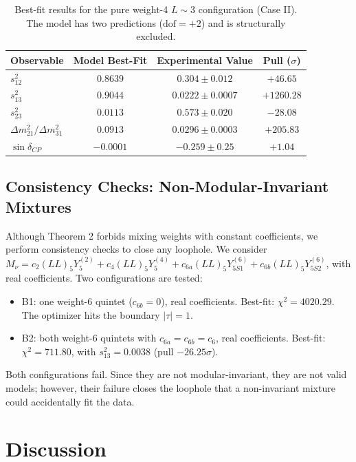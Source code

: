 \documentclass[11pt, a4paper]{article}
\begin{document}
\begin{table}[h]
\centering
\begin{tabular}{lccc}
\toprule
Observable & Model Best-Fit & Experimental Value & Pull (\(\sigma\)) \\
\midrule
\(s_{12}^2\) & \(0.8639\) & \(0.304 \pm 0.012\) & \(+46.65\) \\
\(s_{13}^2\) & \(0.9044\) & \(0.0222 \pm 0.0007\) & \(\mathbf{+1260.28}\) \\
\(s_{23}^2\) & \(0.0113\) & \(0.573 \pm 0.020\) & \(-28.08\) \\
\(\Delta m^2_{21}/\Delta m^2_{31}\) & \(0.0913\) & \(0.0296 \pm 0.0003\) & \(+205.83\) \\
\(\sin\delta_{CP}\) & \(-0.0001\) & \(-0.259 \pm 0.25\) & \(+1.04\) \\
\bottomrule
\end{tabular}
\caption{Best-fit results for the pure weight-4 \(L\sim 3\) configuration (Case II). The model has two predictions (\(\mathrm{dof}=+2\)) and is structurally excluded.}
\label{tab:L3_w4_fit}
\end{table}

\subsection{Consistency Checks: Non-Modular-Invariant Mixtures}
Although Theorem 2 forbids mixing weights with constant coefficients, we perform consistency checks to close any loophole. We consider \(M_\nu = c_2 (LL)_5 Y_5^{(2)} + c_4 (LL)_5 Y_5^{(4)} + c_{6a} (LL)_5 Y_{5S1}^{(6)} + c_{6b} (LL)_5 Y_{5S2}^{(6)}\), with real coefficients. Two configurations are tested:
\begin{itemize}
    \item B1: one weight-6 quintet (\(c_{6b}=0\)), real coefficients. Best-fit: \(\chi^2 = 4020.29\). The optimizer hits the boundary \(|\tau|=1\).
    \item B2: both weight-6 quintets with \(c_{6a}=c_{6b}=c_6\), real coefficients. Best-fit: \(\chi^2 = 711.80\), with \(s_{13}^2 = 0.0038\) (pull \(-26.25\sigma\)).
\end{itemize}
Both configurations fail. Since they are not modular-invariant, they are not valid models; however, their failure closes the loophole that a non-invariant mixture could accidentally fit the data.

\section{Discussion}
\end{document}
